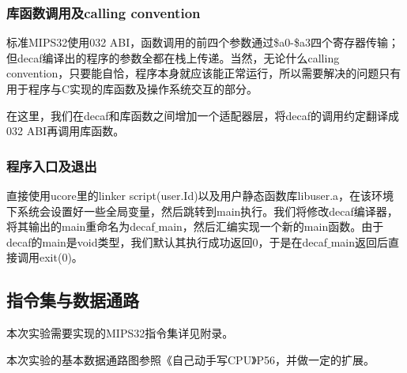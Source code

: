 \subsubsection{库函数调用及calling convention}
标准MIPS32使用032 ABI，函数调用的前四个参数通过\$a0-\$a3四个寄存器传输；但decaf编译出的程序的参数全都在栈上传递。当然，无论什么calling convention，只要能自恰，程序本身就应该能正常运行，所以需要解决的问题只有用于程序与C实现的库函数及操作系统交互的部分。

在这里，我们在decaf和库函数之间增加一个适配器层，将decaf的调用约定翻译成032 ABI再调用库函数。
\subsubsection{程序入口及退出}
直接使用ucore里的linker script(user.Id)以及用户静态函数库libuser.a，在该环境下系统会设置好一些全局变量，然后跳转到main执行。我们将修改decaf编译器，将其输出的main重命名为decaf$\_$main，然后汇编实现一个新的main函数。由于decaf的main是void类型，我们默认其执行成功返回0，于是在decaf$\_$main返回后直接调用exit(0)。
\subsection{指令集与数据通路}
本次实验需要实现的MIPS32指令集详见附录。

本次实验的基本数据通路图参照《自己动手写CPU》P56，并做一定的扩展。
